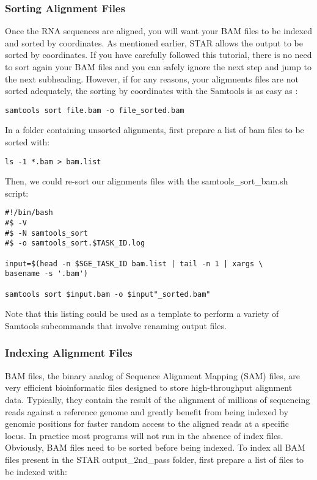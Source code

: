 \subsubsection{Sorting Alignment Files}


Once the RNA sequences are aligned, you will want your BAM files to be indexed and sorted by coordinates. As mentioned earlier, STAR allows the output to be sorted by coordinates. If you have carefully followed this tutorial, there is no need to sort again your BAM files and you can safely ignore the next step and jump to the next subheading. However, if for any reasons, your aligmnents files are not sorted adequately, the sorting by coordinates with the Samtools is as easy as :

\begin{verbatim}
samtools sort file.bam -o file_sorted.bam
\end{verbatim}

In a folder containing unsorted alignments, first prepare a list of bam files to be sorted with:

\begin{verbatim}
ls -1 *.bam > bam.list
\end{verbatim}

Then, we could re-sort our alignments files with the \noindent samtools\_sort\_bam.sh script:

\begin{verbatim}
#!/bin/bash
#$ -V
#$ -N samtools_sort
#$ -o samtools_sort.$TASK_ID.log

input=$(head -n $SGE_TASK_ID bam.list | tail -n 1 | xargs \
basename -s '.bam')

samtools sort $input.bam -o $input"_sorted.bam"

\end{verbatim}

Note that this listing could be used as a template to perform a variety of Samtools subcommands that involve renaming output files.

\subsubsection{Indexing Alignment Files}

BAM files, the binary analog of Sequence Alignment Mapping (SAM) files,  are very efficient bioinformatic files designed to store high-throughput alignment data. Typically, they contain the result of the alignment of millions of sequencing reads against a reference genome and greatly benefit from being indexed by genomic positions for faster random access to the aligned reads at a specific locus. In practice most programs will not run in the absence of index files. Obviously, BAM files need to be sorted before being indexed. To index all BAM files present in the STAR output\_2nd\_pass folder, first prepare a list of files to be indexed with:

